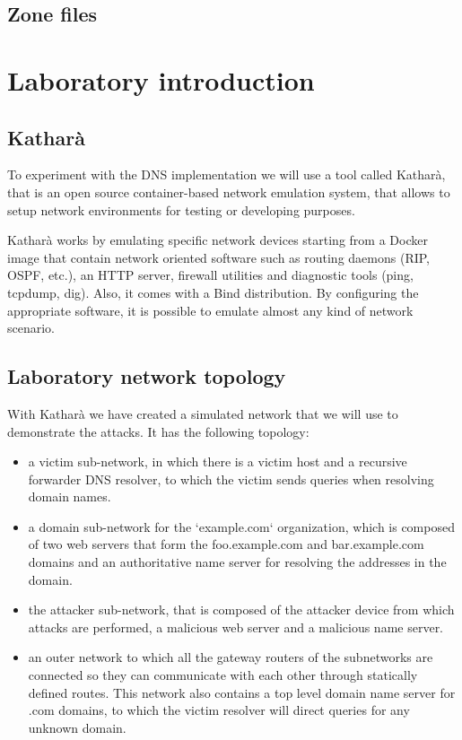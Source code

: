 \documentclass[11pt,a4paper]{article}
\begin{document}
\subsection{Zone files}

\section{Laboratory introduction}

\subsection{Katharà}
To experiment with the DNS implementation we will use a tool called Katharà, that is an open source container-based network emulation system, that allows to setup network environments for testing or developing purposes.

\noindent
Katharà works by emulating specific network devices starting from a Docker image that contain network oriented software such as routing daemons (RIP, OSPF, etc.), an HTTP server, firewall utilities and diagnostic tools (ping, tcpdump, dig). Also, it comes with a Bind distribution.
By configuring the appropriate software, it is possible to emulate almost any kind of network scenario.

\subsection{Laboratory network topology}

With Katharà we have created a simulated network that we will use to demonstrate the attacks. It has the following topology:
\begin{itemize}
\item a victim sub-network, in which there is a victim host and a recursive forwarder DNS resolver, to which the victim sends queries when resolving domain names.
\item a domain sub-network for the `example.com` organization, which is composed of two web servers that form the foo.example.com and bar.example.com domains and an authoritative name server for resolving the addresses in the domain.
\item the attacker sub-network, that is composed of the attacker device from which attacks are performed, a malicious web server and a malicious name server.
\item an outer network to which all the gateway routers of the subnetworks are connected so they can communicate with each other through statically defined routes. This network also contains a top level domain name server for .com domains, to which the victim resolver will direct queries for any unknown domain.
\end{itemize}
\end{document}
